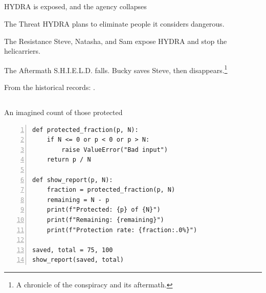 \subsection{\returntitle}
\begin{frame}{\returntitle}{HYDRA is exposed, and the agency collapses}
    \begin{block}{The Threat}
        HYDRA plans to eliminate people it considers dangerous.
    \end{block}
    \begin{alertblock}{The Resistance}
        Steve, Natasha, and Sam expose HYDRA and stop the helicarriers.
    \end{alertblock}
    \begin{exampleblock}{The Aftermath}
        S.H.I.E.L.D. falls. Bucky saves Steve, then disappears.\footnote{A chronicle of the conspiracy and its aftermath.}
    \end{exampleblock}
    \medskip
    From the historical records: \citet{lore_thor}.
\end{frame}

\subsection{\modeltitle}
\begin{frame}[fragile]{\modeltitle}{An imagined count of those protected}
    \begin{SlideCenteredCode}
        \begin{Verbatim}[fontsize=\footnotesize,numbers=left,numbersep=5pt]
def protected_fraction(p, N):
    if N <= 0 or p < 0 or p > N:
        raise ValueError("Bad input")
    return p / N

def show_report(p, N):
    fraction = protected_fraction(p, N)
    remaining = N - p
    print(f"Protected: {p} of {N}")
    print(f"Remaining: {remaining}")
    print(f"Protection rate: {fraction:.0%}")

saved, total = 75, 100
show_report(saved, total)
      \end{Verbatim}
    \end{SlideCenteredCode}
\end{frame}

